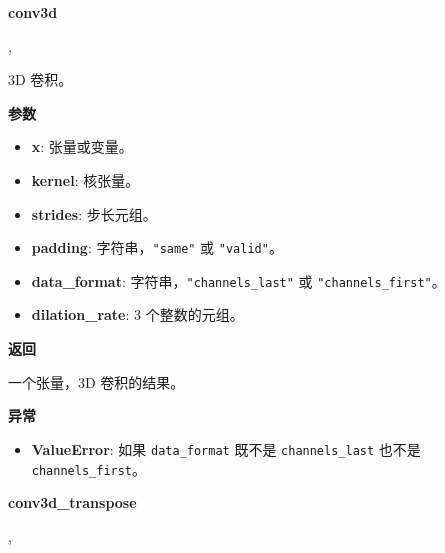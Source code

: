 \textbf{conv3d}\label{conv3d}

\begin{Shaded}
\begin{Highlighting}[]
\OperatorTok{=}\NormalTok{(}\NormalTok{, }\NormalTok{, }\OperatorTok{=},\\
\hspace{3cm}\OperatorTok{=}\OperatorTok{=}\NormalTok{(}\NormalTok{, }\NormalTok{, }\NormalTok{))}
\end{Highlighting}
\end{Shaded}

3D 卷积。

\textbf{参数}

\begin{itemize}
\tightlist
\item
  \textbf{x}: 张量或变量。
\item
  \textbf{kernel}: 核张量。
\item
  \textbf{strides}: 步长元组。
\item
  \textbf{padding}: 字符串，\texttt{"same"} 或 \texttt{"valid"}。
\item
  \textbf{data\_format}: 字符串，\texttt{"channels\_last"} 或
  \texttt{"channels\_first"}。
\item
  \textbf{dilation\_rate}: 3 个整数的元组。
\end{itemize}

\textbf{返回}

一个张量，3D 卷积的结果。

\textbf{异常}

\begin{itemize}
\tightlist
\item
  \textbf{ValueError}: 如果 \texttt{data\_format} 既不是
  \texttt{channels\_last} 也不是 \texttt{channels\_first}。
\end{itemize}


\textbf{conv3d\_transpose}\label{conv3dux5ftranspose}

\begin{Shaded}
\begin{Highlighting}[]
\OperatorTok{=}\NormalTok{(}\NormalTok{, }\NormalTok{, }\OperatorTok{=},\\
\hspace{3cm}\OperatorTok{=}\NormalTok{)}
\end{Highlighting}
\end{Shaded}

